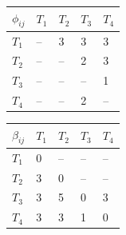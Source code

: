 \documentclass{beamer}
\begin{document}
\begin{frame}
\begin{table}
\begin{minipage}{0.15\textwidth}
	\end{minipage}
	\hspace{0mm}
	\begin{minipage}{0.3\textwidth}
		\centering
		\begin{tabular}{lllll}
			\toprule
			$\phi_{ij}$ & $T_1$ & $T_2$ & $T_3$ & $T_4$ \\\midrule
			$T_1$ & -- & 3 & 3 & 3 \\
			$T_2$ & -- & -- & 2 & 3 \\
			$T_3$ & -- & -- & -- & 1 \\
			$T_4$ & -- & -- & 2 & -- \\
			\bottomrule
		\end{tabular}
	\end{minipage}
	\hspace{10mm}
	\begin{minipage}{0.3\textwidth}
		\centering
		\begin{tabular}{lllll}
			\toprule
			$\beta_{ij}$ & $T_1$ & $T_2$ & $T_3$ & $T_4$ \\\midrule
			$T_1$ & 0 & -- & -- & -- \\
			$T_2$ & 3 & 0 & -- & -- \\
			$T_3$ & 3 & 5 & 0 & 3 \\
			$T_4$ & 3 & 3 & 1 & 0 \\
			\bottomrule
		\end{tabular}
	\end{minipage}
\end{table}
\pause
\begin{figure}
	\centering

\end{figure}
\end{frame}
\end{document}
